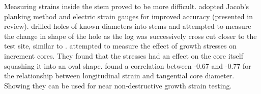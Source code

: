 Measuring strains inside the stem proved to be more difficult. \cite{kikata1972}
adopted Jacob's planking method and electric strain gauges for improved accuracy (presented in \cite{kubler_1987} review).
\cite{wilhelmy1973probe} drilled holes of known diameters into stems and
attempted to measure the change in shape of the hole as the log was successively
cross cut closer to the test site, similar to \cite{boyd1950a}. \cite{ISI:A1979HU45700004}  attempted to measure the effect of growth stresses on increment cores.
They found that the stresses had an effect on the core itself
squashing it into an oval shape. \cite{FERRAND_1982} found a correlation between -0.67 and -0.77 for the relationship between
longitudinal strain and tangential core diameter. Showing
they can be used for near non-destructive growth strain testing.